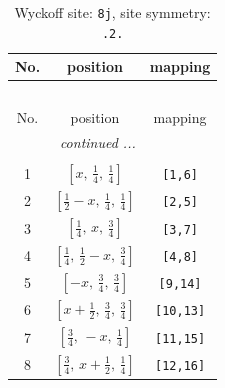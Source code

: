 \documentclass[fleqn,8pt]{jsarticle}
\begin{document}
\begin{longtable}{ccc}
\caption{Wyckoff site: {\tt 8j}, site symmetry: {\tt .2.}}
 \\
 \hline \hline
No. & position & mapping \\ \hline \endfirsthead

\multicolumn{2}{l}{\tablename\ \thetable{}} \\
 \hline \hline
No. & position & mapping \\ \hline \endhead

 \hline \hline
\multicolumn{2}{r}{\footnotesize\it continued ...} \\ \endfoot

 \hline \hline
\multicolumn{2}{r}{} \\ \endlastfoot

1 & $\left[ x,\, \frac{1}{4},\, \frac{1}{4} \right]$ & {\tt [1,6]} \\ \hline
2 & $\left[ \frac{1}{2} - x,\, \frac{1}{4},\, \frac{1}{4} \right]$ & {\tt [2,5]} \\ \hline
3 & $\left[ \frac{1}{4},\, x,\, \frac{3}{4} \right]$ & {\tt [3,7]} \\ \hline
4 & $\left[ \frac{1}{4},\, \frac{1}{2} - x,\, \frac{3}{4} \right]$ & {\tt [4,8]} \\ \hline
5 & $\left[ - x,\, \frac{3}{4},\, \frac{3}{4} \right]$ & {\tt [9,14]} \\ \hline
6 & $\left[ x + \frac{1}{2},\, \frac{3}{4},\, \frac{3}{4} \right]$ & {\tt [10,13]} \\ \hline
7 & $\left[ \frac{3}{4},\, - x,\, \frac{1}{4} \right]$ & {\tt [11,15]} \\ \hline
8 & $\left[ \frac{3}{4},\, x + \frac{1}{2},\, \frac{1}{4} \right]$ & {\tt [12,16]} \\
\end{longtable}
\renewcommand{\arraystretch}{1.2}
\end{document}

